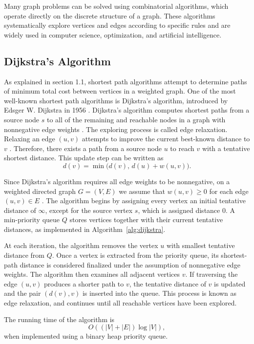 \documentclass[12pt]{report}
\begin{document}
Many graph problems can be solved using combinatorial algorithms, which operate directly on the discrete structure of a graph. These algorithms systematically explore vertices and edges according to specific rules and are widely used in computer science, optimization, and artificial intelligence.

\subsection{Dijkstra’s Algorithm}

As explained in section 1.1, shortest path algorithms attempt to determine paths of minimum total cost between vertices in a weighted graph. One of the most well-known shortest path algorithms is Dijkstra's algorithm, introduced by Edsger W. Dijkstra in 1956 \cite{Ortega}. Dijkstra's algorithm computes shortest paths from a source node $s$ to all of the remaining and reachable nodes in a graph with nonnegative edge weights \cite{Ortega}. The exploring process is called edge relaxation. Relaxing an edge $(u,v)$ attempts to improve the current best-known distance to $v$ \cite{Ortega}. Therefore, there exists a path from a source node $u$ to reach $v$ with a tentative shortest distance. This update step can be written as
\[
d(v) = \min\big(d(v),\, d(u) + w(u,v)\big).
\]

Since Dijkstra's algorithm requires all edge weights to be nonnegative, on a weighted directed graph $G = (V,E)$ we assume that $w(u,v) \geq 0$ for each edge $(u,v) \in E$ \cite{Ortega}. The algorithm begins by assigning every vertex an initial tentative distance of $\infty$, except for the source vertex $s$, which is assigned distance $0$. A min-priority queue $Q$ stores vertices together with their current tentative distances, as implemented in Algorithm~\ref{alg:dijkstra}.

At each iteration, the algorithm removes the vertex $u$ with smallest tentative distance from $Q$. Once a vertex is extracted from the priority queue, its shortest-path distance is considered finalized under the assumption of nonnegative edge weights. The algorithm then examines all adjacent vertices $v$. If traversing the edge $(u,v)$ produces a shorter path to $v$, the tentative distance of $v$ is updated and the pair $(d(v),v)$ is inserted into the queue. This process is known as edge relaxation, and continues until all reachable vertices have been explored.

The running time of the algorithm is
\[
O((|V| + |E|)\log |V|),
\]
when implemented using a binary heap priority queue.
\end{document}
